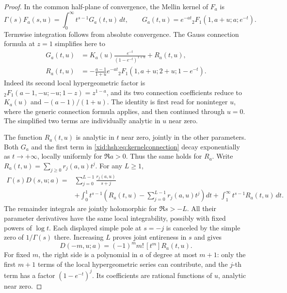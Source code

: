 \begin{proof}
In the common half-plane of convergence, the Mellin kernel of $F_a$ is
\begin{equation}\label{xid:hsh:eq:Mellin}
 \Gamma(s)F_a(s,u)=\int_0^{\infty}t^{s-1}G_a(t,u)\,dt,
 \qquad G_a(t,u)=e^{-at}
          {}_2F_1(1,a+u;a;e^{-t}).
\end{equation}
Termwise integration follows from absolute convergence. The Gauss
connection formula at $z=1$ \cite{hsh:DLMFGauss} simplifies here to
\begin{equation}\label{xid:hsh:eq:kernelconnection}
 \begin{split}
 G_a(t,u)&=K_a(u)\frac{e^{-t}}{(1-e^{-t})^{1+u}}+R_a(t,u),\\
 R_a(t,u)&=-\frac{a-1}{1+u}e^{-at}
       {}_2F_1(1,a+u;2+u;1-e^{-t}).
 \end{split}
\end{equation}
Indeed its second local hypergeometric factor is
${}_2F_1(a-1,-u;-u;1-z)=z^{1-a}$, and its two connection
coefficients reduce to $K_a(u)$ and $-(a-1)/(1+u)$.
The identity is first read for noninteger $u$, where the generic
connection formula applies, and then continued through $u=0$.
The simplified two terms are individually analytic in $u$ near zero.

The function $R_a(t,u)$ is analytic in $t$ near zero, jointly in the
other parameters. Both $G_a$ and the first term in
\eqref{xid:hsh:eq:kernelconnection} decay exponentially as $t\to+\infty$,
locally uniformly for $\Re a>0$. Thus the same holds for $R_a$.
Write $R_a(t,u)=\sum_{j\ge0}r_j(a,u)t^j$. For any $L\ge1$,
\[
 \begin{split}
 \Gamma(s)D(s,u;a)={}&\sum_{j=0}^{L-1}\frac{r_j(a,u)}{s+j}\\
 &+\int_0^1t^{s-1}\left(R_a(t,u)-\sum_{j=0}^{L-1}r_j(a,u)t^j\right)dt
  +\int_1^{\infty}t^{s-1}R_a(t,u)\,dt.
 \end{split}
\]
The remainder integrals are jointly holomorphic for $\Re s>-L$.
All their parameter derivatives have the same local integrability,
possibly with fixed powers of $\log t$. Each displayed simple pole
at $s=-j$ is canceled by the simple zero of $1/\Gamma(s)$ there.
Increasing $L$ proves joint entireness in $s$ and gives
\begin{equation}\label{xid:hsh:eq:Dlocal}
 D(-m,u;a)=(-1)^m m!\,[t^m]R_a(t,u).
\end{equation}
For fixed $m$, the right side is a polynomial in $a$ of degree at most
$m+1$: only the first $m+1$ terms of the local hypergeometric series
can contribute, and the $j$-th term has a factor $(1-e^{-t})^j$.
Its coefficients are rational functions of $u$, analytic near zero.


\end{proof}
